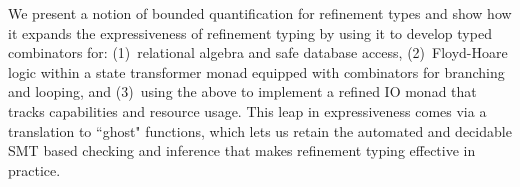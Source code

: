 We present a notion of bounded quantification for refinement types
and show how it expands the expressiveness of refinement typing
by using it to develop typed combinators for:
%
(1)~relational algebra and safe database access,
%
(2)~Floyd-Hoare logic within a state transformer
    monad equipped with combinators for branching
    and looping, and
%
(3)~using the above to implement a refined IO
    monad that tracks capabilities and resource usage.
%
This leap in expressiveness comes via a translation to ``ghost" functions,
which lets us retain the automated and decidable SMT based checking and
inference that makes refinement typing effective in practice.
